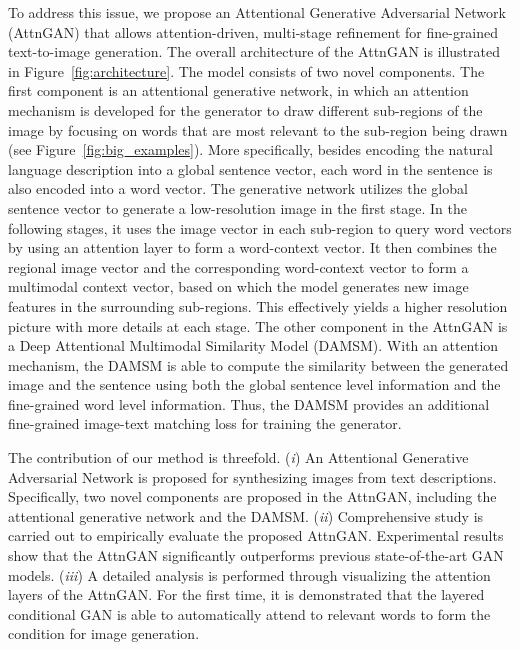 \documentclass[10pt,twocolumn,letterpaper]{article}
\begin{document}
To address this issue, we propose an Attentional Generative Adversarial Network (AttnGAN) that allows attention-driven, multi-stage refinement for fine-grained text-to-image generation. The overall architecture of the AttnGAN is illustrated in Figure~\ref{fig:architecture}. The model consists of two novel components.  The first component is an attentional generative network, in which an attention mechanism is developed for the generator to draw different sub-regions of the image by focusing on words that are most relevant to the sub-region being drawn (see Figure~\ref{fig:big_examples}). More specifically, besides encoding the natural language description into a global sentence vector, each word in the sentence is also encoded into a word vector. The generative network utilizes the global sentence vector to generate a low-resolution image in the first stage. In the following stages, it uses the image vector in each sub-region to query word vectors by using an attention layer to form a word-context vector. It then combines the regional image vector and the corresponding word-context vector to form a multimodal context vector, based on which the model generates new image features in the surrounding sub-regions. This effectively yields a higher resolution picture with more details at each stage. The other component in the AttnGAN is a Deep Attentional Multimodal Similarity Model (DAMSM).   With an attention mechanism, the DAMSM is able to compute the similarity between the generated image and the sentence using both the global sentence level information and the fine-grained word level information. Thus, the DAMSM provides an additional fine-grained image-text matching loss for training the generator. 


The contribution of our method is threefold. 
(\textit{i}) An Attentional Generative Adversarial Network is proposed for synthesizing images from text descriptions. 
Specifically, two novel components are proposed in the AttnGAN, including the attentional generative network and the DAMSM. 
(\textit{ii}) Comprehensive study is carried out to empirically evaluate the proposed AttnGAN.  Experimental results show that the AttnGAN significantly outperforms previous state-of-the-art GAN models. 
(\textit{iii}) A detailed analysis is performed through visualizing the attention layers of the AttnGAN. 
For the first time, it is demonstrated that the layered conditional GAN is able to automatically attend to relevant words to form the condition for image generation. 
\end{document}

